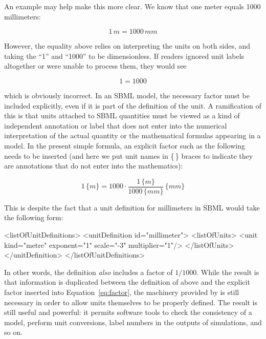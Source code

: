 An example may help make this more clear.  We know that one meter
equals 1000 millimeters:
\begin{linenomath}
  \begin{equation*}
    1\, m = 1000\, mm
  \end{equation*}
\end{linenomath}
However, the equality above relies on interpreting the units on
both sides, and taking the ``1'' and ``1000'' to be dimensionless.
If readers ignored unit labels altogether or were unable to
process them, they would see
\begin{linenomath}
  \begin{equation*}
    1 = 1000
  \end{equation*}
\end{linenomath}
which is obviously incorrect.  In an SBML model, the necessary
factor must be included explicitly, even if it is part of the
definition of the unit.  A ramification of this is that units
attached to SBML quantities must be viewed as a kind of
independent annotation or label that does not enter into the
numerical interpretation of the actual quantity or the
mathematical formulas appearing in a model.  In the present simple
formula, an explicit factor such as the following needs to be
inserted (and here we put unit names in \{$\,$\} braces to
indicate they are annotations that do not enter into the
mathematics):
\begin{linenomath}
  \begin{equation}\label{eq:factor}
    1 \, \{m\} = 1000 \cdot \frac{1 \, \{m\}}{1000 \, \{mm\}} \, \{mm\}
  \end{equation}
\end{linenomath}
This is despite the fact that a unit definition for millimeters in SBML
would take the following form:
\begin{example}
<listOfUnitDefinitions>
    <unitDefinition id="millimeter">
        <listOfUnits>
            <unit kind="metre" exponent="1" scale="-3" multiplier="1"/>
        </listOfUnits>
    </unitDefinition>
</listOfUnitDefinitions>
\end{example}

In other words, the definition \emph{also} includes a factor of
$1/1000$.  While the result is that information is duplicated
between the definition of  above and the
explicit factor inserted into Equation~\ref{eq:factor}, the
machinery provided by \UnitDefinition is still necessary in order
to allow units themselves to be properly defined.  The result is
still useful and powerful: it permits software tools to check the
consistency of a model, perform unit conversions, label numbers in
the outputs of simulations, and so on.


